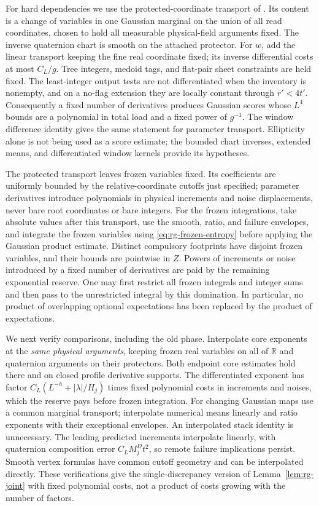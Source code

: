 For hard dependencies we use the protected-coordinate transport of
\cite[Section ``Prepared factors and a joint integral estimate'',
transport identity, and Appendix ``Joint majorants for Gaussian
prepared factors'']{SharpO4}.  Its content is a change of variables in
one Gaussian marginal on the union of all read coordinates, chosen to
hold all measurable physical-field arguments fixed.  The inverse
quaternion chart is smooth on the attached protector.  For $w$, add the
linear transport keeping the fine real coordinate fixed; its inverse
differential costs at most $C_L/g$.  Tree integers, medoid tags, and
flat-pair sheet constraints are held fixed.  The least-integer output
tests are not differentiated when the inventory is nonempty, and on a
no-flag extension they are locally constant through $r'<4t'$.
Consequently a fixed number of derivatives produces Gaussian scores
whose $L^4$ bounds are a polynomial in total load and a fixed power of
$g^{-1}$.  The window difference identity gives the same statement for
parameter transport.  Ellipticity alone is not being used as a score
estimate; the bounded chart inverses, extended means, and differentiated
window kernels provide its hypotheses.

The protected transport leaves frozen variables fixed.  Its coefficients
are uniformly bounded by the relative-coordinate cutoffs just specified;
parameter derivatives introduce polynomials in physical increments and
noise displacements, never bare root coordinates or bare integers.
For the frozen integrations, take absolute values after this transport,
use the smooth, ratio, and failure envelopes, and integrate the frozen
variables using \eqref{eq:rg-frozen-entropy} before applying the Gaussian
product estimate.  Distinct compulsory footprints have disjoint frozen
variables, and their bounds are pointwise in $Z$.  Powers of increments
or noise introduced by a fixed number of derivatives are paid by the
remaining exponential reserve.  One may first restrict all frozen
integrals and integer sums and then pass to the unrestricted integral
by this domination.  In particular, no product of overlapping optional
expectations has been replaced by the product of expectations.

We next verify comparisons, including the old phase.  Interpolate core
exponents at the \emph{same physical arguments}, keeping frozen real
variables on all of $\mathbb R$ and quaternion arguments on their
protectors.  Both endpoint core estimates hold there and on closed
profile derivative supports.  The differentiated exponent has factor
$C_L(L^{-h}+|\lambda|/H_j)$ times fixed polynomial costs in increments
and noises, which the reserve pays before frozen integration.  For
changing Gaussian maps use a common marginal transport; interpolate
numerical means linearly and ratio exponents with their exceptional
envelopes.  An interpolated stack identity is unnecessary.  The leading
predicted increments interpolate linearly, with quaternion composition
error $C_LM_j^Dt^2$, so remote failure implications persist.  Smooth
vertex formulas have common cutoff geometry and can be interpolated
directly.  These verifications give the single-discrepancy version of
Lemma~\ref{lem:rg-joint} with fixed polynomial costs, not a product of
costs growing with the number of factors.

